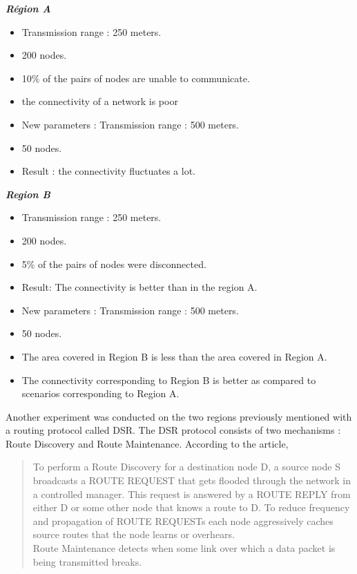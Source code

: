 \newpage

\begin{multicols}{2}
\textit{\textbf{Région A}}
\begin{itemize}
\item Transmission range : 250 meters.
\item 200 nodes.
\item 10\% of the pairs of nodes are unable to communicate.
\item the connectivity of a network is poor
\item New parameters : Transmission range : 500 meters.
\item 50 nodes.
\item Result : the connectivity fluctuates a lot.
\end{itemize}
\columnbreak
\textit{\textbf{Region B}}
\begin{itemize}
\item Transmission range : 250 meters.
\item 200 nodes.
\item 5\% of the pairs of nodes were disconnected.
\item Result: The connectivity is better than in the region A.
\item New parameters : Transmission range : 500 meters.
\item 50 nodes.
\item The area covered in Region B is less than the area covered in Region A.
\item The connectivity corresponding to Region B is better as compared to scenarios corresponding to Region A.
\end{itemize}
\end{multicols}

Another experiment was conducted on the two regions previously mentioned with a routing protocol called DSR. The DSR protocol consists of two mechanisms : Route Discovery and Route Maintenance. According to the article, 
\begin{quotation}
To perform a Route Discovery for a destination node D, a source node S broadcasts a ROUTE REQUEST that gets flooded through the network in a controlled manager. This request is answered by a ROUTE REPLY from either D or some other node that knows a route to D. To reduce frequency and propagation of ROUTE REQUESTs each node aggressively caches source routes that the node learns or overhears.\\
Route Maintenance detects when some link over which a data packet is being transmitted breaks\cite{VehicularAdHocNetworks9}.
\end{quotation}

